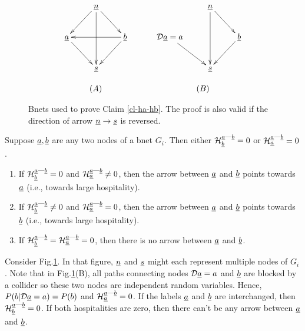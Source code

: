 \documentclass[12pt]{article}
\newcommand{\linkab }[0]{{\rva\text{---}\rvb}}
\begin{document}
\begin{figure}[h!]
$$
\begin{array}{ccc}
\xymatrix{
&\rvn\ar[ld]\ar[rd]\ar[dd]
\\
\rva\ar[rd]
&&\rvb\ar[ll]
\ar[ld]
\\
&
\rvs
}
&\quad&
\xymatrix{
&\rvn\ar[rd]\ar[dd]
\\
\cald\rva = a\ar[rd]
&&\rvb
\ar[ld]
\\
&
\rvs
}
\\
\\
(A)&&\quad(B)
\end{array}
$$
\caption{Bnets used 
to prove Claim \ref{cl-ha-hb}.
The proof is also valid if the
direction of
arrow ${\underline{n}}\rightarrow{\underline{s}}$
is reversed. }
\label{fig-ha-hb}
\end{figure} 


\begin{claim}\label{cl-ha-hb}
Suppose ${\underline{a}}, {\underline{b}}$ 
are any two nodes of
a bnet $G_i$. Then
either 
$\calh_\rvb^\linkab=0$ or  $\calh_\rva^\linkab=0$.
\begin{enumerate}
\item 
If $\calh_\rvb^\linkab=0$ and  $\calh_\rva^\linkab\neq 0$, then
the arrow between ${\underline{a}}$
and ${\underline{b}}$ points towards ${\underline{a}}$
(i.e., towards large hospitality).
\item
If $\calh_\rvb^\linkab\neq 0$ and  $\calh_\rva^\linkab= 0$, then
the arrow between ${\underline{a}}$
and ${\underline{b}}$ points towards ${\underline{b}}$
(i.e., towards large hospitality).

\item
If
$\calh_\rvb^\linkab= \calh_\rva^\linkab=0$,
then 
there is no arrow between
${\underline{a}}$ and ${\underline{b}}$.


\end{enumerate}
\end{claim}
\proof

Consider Fig.\ref{fig-ha-hb}.
In that figure, ${\underline{n}}$ and ${\underline{s}}$
might each represent multiple nodes
of $G_i$.
Note that in 
Fig.\ref{fig-ha-hb}(B),
all paths connecting nodes ${\cal D} {\underline{a}}=a$ and 
${\underline{b}}$ are blocked by a collider
so these two nodes are independent
random variables.
Hence, $P(b|{\cal D} {\underline{a}}=a)= P(b)$
and $\calh_\rva^\linkab=0$.
If the labels ${\underline{a}}$ and ${\underline{b}}$ are 
interchanged, then 
$\calh_\rvb^\linkab=0$.
If both hospitalities 
are zero, then there can't be any arrow
between ${\underline{a}}$ and ${\underline{b}}$.
\end{document}
